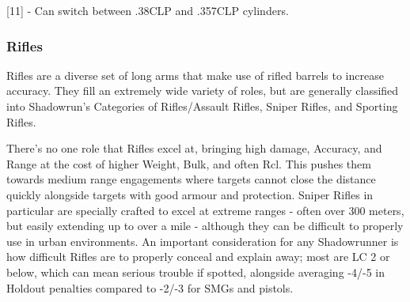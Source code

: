 [11] - Can switch between .38CLP and .357CLP cylinders.

\subsubsection{Rifles}

Rifles are a diverse set of long arms that make use of rifled barrels to increase accuracy. They fill an extremely wide variety of roles, but are generally classified into Shadowrun's Categories of Rifles/Assault Rifles, Sniper Rifles, and Sporting Rifles.

There's no one role that Rifles excel at, bringing high damage, Accuracy, and Range at the cost of higher Weight, Bulk, and often Rcl. This pushes them towards medium range engagements where targets cannot close the distance quickly alongside targets with good armour and protection. Sniper Rifles in particular are specially crafted to excel at extreme ranges - often over 300 meters, but easily extending up to over a mile - although they can be difficult to properly use in urban environments. An important consideration for any Shadowrunner is how difficult Rifles are to properly conceal and explain away; most are LC 2 or below, which can mean serious trouble if spotted, alongside averaging -4/-5 in Holdout penalties compared to -2/-3 for SMGs and pistols.

